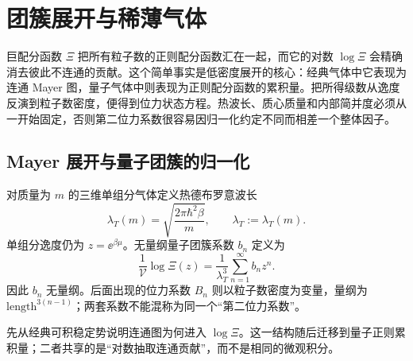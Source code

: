 \chapter{团簇展开与稀薄气体}
\label{chap:mayer-virial}

巨配分函数 \(\Xi\) 把所有粒子数的正则配分函数汇在一起，而它的对数 \(\log\Xi\) 会精确消去彼此不连通的贡献。这个简单事实是低密度展开的核心：经典气体中它表现为连通 Mayer 图，量子气体中则表现为正则配分函数的累积量。把所得级数从逸度反演到粒子数密度，便得到位力状态方程。热波长、质心质量和内部简并度必须从一开始固定，否则第二位力系数很容易因归一化约定不同而相差一个整体因子。

\section{Mayer 展开与量子团簇的归一化}

对质量为 \(m\) 的三维单组分气体定义热德布罗意波长
\begin{equation}
 \lambda_T(m)
 =\sqrt{\frac{2\pi\hbar^2\beta}{m}},
 \qquad
 \lambda_T:=\lambda_T(m).
 \label{eq:phys-sm-thermal-wavelength}
\end{equation}
单组分逸度仍为 \(z=\ee^{\beta\mu}\)。无量纲量子团簇系数 \(b_n\) 定义为
\begin{equation}
 \frac{1}{\mathcal V}\log\Xi(z)
 =\frac{1}{\lambda_T^3}
 \sum_{n=1}^{\infty}b_n z^n.
 \label{eq:phys-sm-cluster-convention}
\end{equation}
因此 \(b_n\) 无量纲。后面出现的位力系数 \(B_n\) 则以粒子数密度为变量，量纲为 \(\mathrm{length}^{3(n-1)}\)；两套系数不能混称为同一个“第二位力系数”。

先从经典可积稳定势说明连通图为何进入 \(\log\Xi\)。这一结构随后迁移到量子正则累积量；二者共享的是“对数抽取连通贡献”，而不是相同的微观积分。

